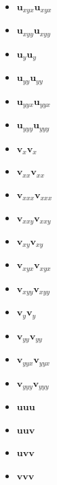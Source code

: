 \documentclass[unicode,11pt,a4paper,oneside,numbers=endperiod,openany]{scrartcl}
\begin{document}
\begin{multicols}{5}
\begin{itemize}[noitemsep, topsep=0pt, left=0pt]
    \item $\mathbf{u}_{xyx} \mathbf{u}_{xyx}$
    \item $\mathbf{u}_{xyy} \mathbf{u}_{xyy}$
    \item $\mathbf{u}_{y} \mathbf{u}_{y}$
    \item $\mathbf{u}_{yy} \mathbf{u}_{yy}$
    \item $\mathbf{u}_{yyx} \mathbf{u}_{yyx}$
    \item $\mathbf{u}_{yyy} \mathbf{u}_{yyy}$
    \item $\mathbf{v}_{x} \mathbf{v}_{x}$
    \item $\mathbf{v}_{xx} \mathbf{v}_{xx}$
    \item $\mathbf{v}_{xxx} \mathbf{v}_{xxx}$
    \item $\mathbf{v}_{xxy} \mathbf{v}_{xxy}$
    \item $\mathbf{v}_{xy} \mathbf{v}_{xy}$
    \item $\mathbf{v}_{xyx} \mathbf{v}_{xyx}$
    \item $\mathbf{v}_{xyy} \mathbf{v}_{xyy}$
    \item $\mathbf{v}_{y} \mathbf{v}_{y}$
    \item $\mathbf{v}_{yy} \mathbf{v}_{yy}$
    \item $\mathbf{v}_{yyx} \mathbf{v}_{yyx}$
    \item $\mathbf{v}_{yyy} \mathbf{v}_{yyy}$
    \item $\mathbf{u} \mathbf{u} \mathbf{u}$
    \item $\mathbf{u} \mathbf{u} \mathbf{v}$
    \item $\mathbf{u} \mathbf{v} \mathbf{v}$
    \item $\mathbf{v} \mathbf{v} \mathbf{v}$
\end{itemize}
\end{multicols}



\end{document}
